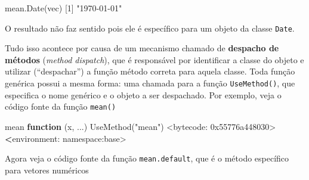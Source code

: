 \documentclass[
  10pt,
  a4paper]{book}
\newenvironment{Shaded}{\begin{snugshade}}{\end{snugshade}}
\newcommand{\ControlFlowTok}[1]{\textcolor[rgb]{0.13,0.29,0.53}{\textbf{#1}}}
\newcommand{\DecValTok}[1]{\textcolor[rgb]{0.00,0.00,0.81}{#1}}
\newcommand{\ErrorTok}[1]{\textcolor[rgb]{0.64,0.00,0.00}{\textbf{#1}}}
\newcommand{\FunctionTok}[1]{\textcolor[rgb]{0.00,0.00,0.00}{#1}}
\newcommand{\NormalTok}[1]{#1}
\newcommand{\SpecialCharTok}[1]{\textcolor[rgb]{0.00,0.00,0.00}{#1}}
\newcommand{\StringTok}[1]{\textcolor[rgb]{0.31,0.60,0.02}{#1}}
\begin{document}
\begin{Shaded}
\begin{Highlighting}[]
\FunctionTok{mean.Date}\NormalTok{(vec)}
\NormalTok{[}\DecValTok{1}\NormalTok{] }\StringTok{"1970{-}01{-}01"}
\end{Highlighting}
\end{Shaded}

O resultado não faz sentido pois ele é específico para um objeto da
classe \texttt{Date}.

Tudo isso acontece por causa de um mecanismo chamado de \textbf{despacho de
métodos} (\emph{method dispatch}), que é responsável por identificar a
classe do objeto e utilizar (``despachar'') a função método correta para
aquela classe. Toda função genérica possui a mesma forma: uma chamada
para a função \texttt{UseMethod()}, que especifica o nome genérico e o objeto a
ser despachado. Por exemplo, veja o código fonte da função \texttt{mean()}

\begin{Shaded}
\begin{Highlighting}[]
\NormalTok{mean}
\ControlFlowTok{function}\NormalTok{ (x, ...) }
\FunctionTok{UseMethod}\NormalTok{(}\StringTok{"mean"}\NormalTok{)}
\SpecialCharTok{\textless{}}\NormalTok{bytecode}\SpecialCharTok{:} \DecValTok{0x55776a448030}\SpecialCharTok{\textgreater{}}
\ErrorTok{\textless{}}\NormalTok{environment}\SpecialCharTok{:}\NormalTok{ namespace}\SpecialCharTok{:}\NormalTok{base}\SpecialCharTok{\textgreater{}}
\end{Highlighting}
\end{Shaded}

Agora veja o código fonte da função \texttt{mean.default}, que é o método
específico para vetores numéricos
\end{document}
